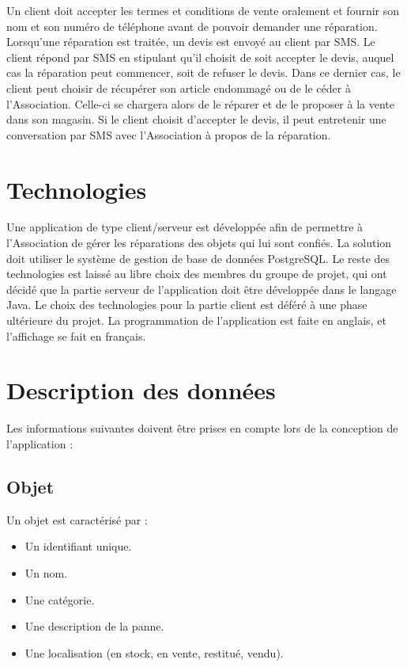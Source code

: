 \documentclass{article}
\begin{document}
Un client doit accepter les termes et conditions de vente oralement et fournir son nom et son numéro de téléphone avant de pouvoir demander une réparation. Lorsqu'une réparation est traitée, un devis est envoyé au client par SMS. Le client répond par SMS en stipulant qu'il choisit de soit accepter le devis, auquel cas la réparation peut commencer, soit de refuser le devis. Dans ce dernier cas, le client peut choisir de récupérer son article endommagé ou de le céder à l'Association. Celle-ci se chargera alors de le réparer et de le proposer à la vente dans son magasin. Si le client choisit d'accepter le devis, il peut entretenir une conversation par SMS avec l'Association à propos de la réparation.

\section{Technologies}
Une application de type client/serveur est développée afin de permettre à l'Association de gérer les réparations des objets qui lui sont confiés. La solution doit utiliser le système de gestion de base de données PostgreSQL. Le reste des technologies est laissé au libre choix des membres du groupe de projet, qui ont décidé que la partie serveur de l'application doit être développée dans le langage Java. Le choix des technologies pour la partie client est déféré à une phase ultérieure du projet. La programmation de l'application est faite en anglais, et l'affichage se fait en français.

\section{Description des données}
Les informations suivantes doivent être prises en compte lors de la conception de l'application :

\subsection*{Objet}
Un objet est caractérisé par :
\begin{itemize}
    \item Un identifiant unique.
    \item Un nom.
    \item Une catégorie.
    \item Une description de la panne.
    \item Une localisation (en stock, en vente, restitué, vendu).
\end{itemize}
\end{document}
